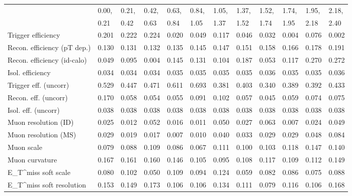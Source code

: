 \begin{tabular}{l|p{0.6cm}p{0.6cm}p{0.6cm}p{0.6cm}p{0.6cm}p{0.6cm}p{0.6cm}p{0.6cm}p{0.6cm}p{0.6cm}p{0.6cm}}
\hline
   & 0.00, & 0.21, & 0.42, & 0.63, & 0.84, & 1.05, & 1.37, & 1.52, & 1.74, & 1.95, & 2.18,  \\ 
   & 0.21 & 0.42 & 0.63 & 0.84 & 1.05 & 1.37 & 1.52 & 1.74 & 1.95 & 2.18 & 2.40  \\ 
\hline
Trigger efficiency                       & 0.201 & 0.222 & 0.224 & 0.020 & 0.049 & 0.117 & 0.046 & 0.032 & 0.004 & 0.076 & 0.002 \\
Recon. efficiency (pT dep.)              & 0.130 & 0.131 & 0.132 & 0.135 & 0.145 & 0.147 & 0.151 & 0.158 & 0.166 & 0.178 & 0.191 \\
Recon. efficiency (id-calo)              & 0.049 & 0.095 & 0.004 & 0.145 & 0.131 & 0.104 & 0.187 & 0.053 & 0.117 & 0.270 & 0.272 \\
Isol. efficiency                         & 0.034 & 0.034 & 0.034 & 0.035 & 0.035 & 0.035 & 0.035 & 0.036 & 0.035 & 0.035 & 0.036 \\
Trigger eff. (uncorr)                    & 0.529 & 0.447 & 0.471 & 0.611 & 0.693 & 0.381 & 0.403 & 0.340 & 0.389 & 0.392 & 0.433 \\
Recon. eff. (uncorr)                     & 0.170 & 0.058 & 0.054 & 0.055 & 0.091 & 0.102 & 0.057 & 0.045 & 0.059 & 0.074 & 0.075 \\
Isol. eff. (uncorr)                      & 0.038 & 0.038 & 0.038 & 0.038 & 0.038 & 0.038 & 0.038 & 0.038 & 0.038 & 0.038 & 0.038 \\
Muon resolution (ID)                     & 0.025 & 0.012 & 0.052 & 0.016 & 0.011 & 0.050 & 0.027 & 0.063 & 0.007 & 0.024 & 0.049 \\
Muon resolution (MS)                     & 0.029 & 0.019 & 0.017 & 0.007 & 0.010 & 0.040 & 0.033 & 0.029 & 0.029 & 0.048 & 0.084 \\
Muon scale                               & 0.079 & 0.088 & 0.109 & 0.086 & 0.067 & 0.111 & 0.100 & 0.103 & 0.118 & 0.147 & 0.140 \\
Muon curvature                           & 0.167 & 0.161 & 0.160 & 0.146 & 0.105 & 0.095 & 0.108 & 0.117 & 0.109 & 0.112 & 0.149 \\
E_{T}^{miss} soft scale                  & 0.080 & 0.102 & 0.050 & 0.109 & 0.094 & 0.124 & 0.059 & 0.082 & 0.086 & 0.075 & 0.088 \\
E_{T}^{miss} soft resolution             & 0.153 & 0.149 & 0.173 & 0.106 & 0.106 & 0.134 & 0.111 & 0.079 & 0.116 & 0.106 & 0.168 \\

\end{tabular}
